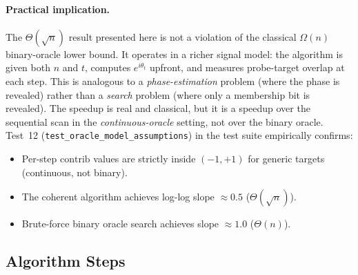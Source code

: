 \documentclass[12pt,a4paper]{article}
\theoremstyle{plain}
\theoremstyle{definition}
\theoremstyle{remark}
\begin{document}
\paragraph{Practical implication.}
The $\Theta(\sqrt{n})$ result presented here is not a violation of the
classical $\Omega(n)$ binary-oracle lower bound.  It operates in a richer
signal model: the algorithm is given both $n$ and $t$, computes
$e^{i\theta_t}$ upfront, and measures probe-target overlap at each step.
This is analogous to a \emph{phase-estimation} problem (where the phase is
revealed) rather than a \emph{search} problem (where only a membership bit is
revealed).  The speedup is real and classical, but it is a speedup over the
sequential scan in the \emph{continuous-oracle} setting, not over the binary
oracle.  Test~12 (\texttt{test\_oracle\_model\_assumptions}) in the test suite
empirically confirms:
\begin{itemize}
  \item Per-step $\mathrm{contrib}$ values are strictly inside $(-1,+1)$ for
        generic targets (continuous, not binary).
  \item The coherent algorithm achieves log-log slope $\approx 0.5$ ($\Theta(\sqrt{n})$).
  \item Brute-force binary oracle search achieves slope $\approx 1.0$ ($\Theta(n)$).
\end{itemize}



\subsection{Algorithm Steps}
\end{document}
